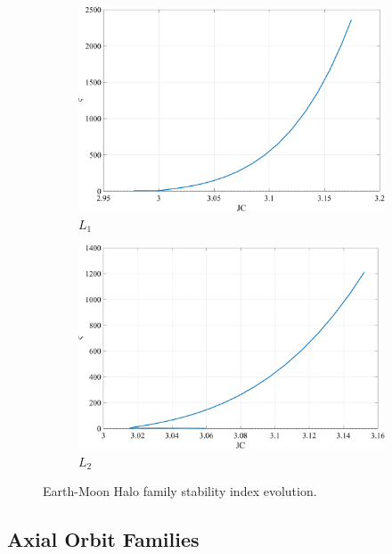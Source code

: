 \begin{figure}[ht]
    \begin{subfigure}[h]{0.4\linewidth}
        \includegraphics[width=\textwidth]{figures/L1HaloStability.pdf}
        \caption{$L_{1}$}
    \end{subfigure}
    \hfill
    \begin{subfigure}[h]{0.4\linewidth}
        \includegraphics[width=\textwidth]{figures/L2HaloStability.pdf}
        \caption{$L_{2}$}
    \end{subfigure}
    \caption{Earth-Moon Halo family stability index evolution.}
    \label{fig:haloStability}
\end{figure}

\subsection{Axial Orbit Families}
